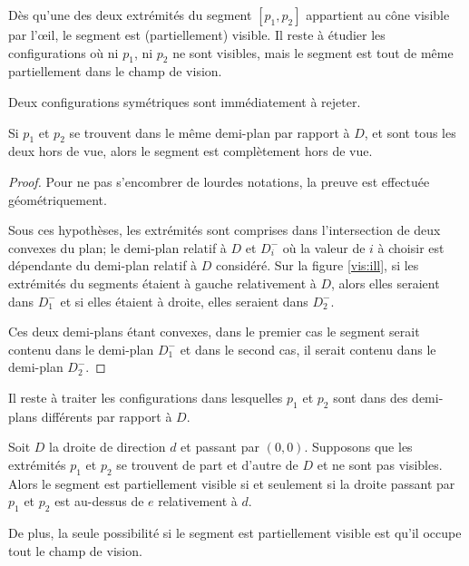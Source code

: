 Dès qu'une des deux extrémités du segment $[p_1, p_2]$ appartient au
cône visible par l'\oe{}il, le segment est (partiellement)
visible. Il reste à étudier les configurations où ni $p_1$, ni $p_2$ ne sont
visibles, mais le segment est tout de même partiellement dans le champ de vision.

Deux configurations symétriques sont immédiatement à rejeter.
\begin{obs}\label{obs:side}
  Si $p_1$ et $p_2$ se trouvent dans le même demi-plan par rapport à $D$,
  et sont tous les deux hors de vue, alors le segment est complètement hors de vue.
\end{obs}
\begin{proof}
  Pour ne pas s'encombrer de lourdes notations, la preuve est effectuée
  géométriquement.

  Sous ces hypothèses, les extrémités sont comprises dans l'intersection
  de deux convexes du plan; le demi-plan relatif à $D$ et $D_i^-$ où la valeur
  de $i$ à choisir est dépendante du demi-plan relatif à $D$ considéré.
  Sur la figure \ref{vis:ill}, si les extrémités du segments étaient
  à gauche relativement à $D$, alors elles seraient dans $D_1^-$ et
  si elles étaient à droite, elles seraient dans $D_2^-$.

  Ces deux demi-plans étant convexes, dans le premier cas le
  segment serait contenu dans le demi-plan $D_1^-$ et dans le second
  cas, il serait contenu dans le demi-plan $D_2^-$.
\end{proof}

Il reste à traiter les configurations dans lesquelles $p_1$
et $p_2$ sont dans des demi-plans différents par rapport à $D$.

\begin{obs}\label{obs:couvr}
  Soit $D$ la droite de direction $d$ et passant par $(0, 0)$.
  Supposons que les extrémités $p_1$ et $p_2$ se trouvent
  de part et d'autre de $D$ et ne sont pas visibles.
  Alors le segment est partiellement visible
  si et seulement si la droite passant par $p_1$
  et $p_2$ est \og au-dessus\fg{} de $e$ relativement à $d$.

  De plus, la seule possibilité si le segment est partiellement
  visible est qu'il occupe tout le champ de vision.
\end{obs}


